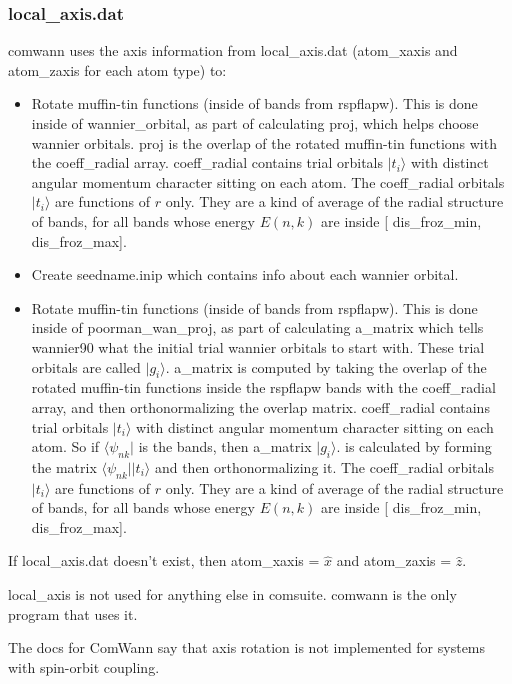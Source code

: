 \documentclass[aps,prb,singlecolumn,preprintnumbers,amsmath,amssymb]{revtex4}
\begin{document}
\subsubsection{local\_axis.dat}
comwann uses the axis information  from local\_axis.dat (atom\_xaxis and atom\_zaxis for each atom type)  to:
  \begin{itemize}
  \item Rotate muffin-tin functions (inside of bands from rspflapw).  This is done inside of wannier\_orbital, as part of calculating proj, which helps choose wannier orbitals.  proj is  the overlap of the rotated muffin-tin functions with the coeff\_radial array.  coeff\_radial contains trial orbitals $|t_i \rangle$ with distinct angular momentum character sitting on  each atom.  The coeff\_radial  orbitals $|t_i \rangle$ are functions of $r$ only.  They are a kind of average of the radial structure of bands, for all bands whose energy $E(n,k)$ are inside [ dis\_froz\_min,  dis\_froz\_max].
  \item Create seedname.inip which contains info about each wannier orbital.
  \item Rotate muffin-tin functions (inside of bands from rspflapw).  This is done inside of poorman\_wan\_proj, as part of calculating a\_matrix which tells wannier90 what the initial trial wannier orbitals to start with.  These trial orbitals are called $|g_i \rangle $.    a\_matrix is  computed by taking the overlap of the rotated muffin-tin functions  inside the rspflapw bands with the coeff\_radial array, and then orthonormalizing the overlap matrix.    coeff\_radial contains trial orbitals $|t_i \rangle$ with distinct angular momentum character sitting on  each atom.  So if $\langle \psi_{nk} | $ is the bands, then a\_matrix $|g_i \rangle $. is calculated by forming the matrix   $\langle \psi_{nk} | |t_i \rangle$ and then orthonormalizing it.  The coeff\_radial  orbitals $|t_i \rangle$ are functions of $r$ only.  They are a kind of average of the radial structure of bands, for all bands whose energy $E(n,k)$ are inside [ dis\_froz\_min,  dis\_froz\_max].
  \end{itemize}
  
  If local\_axis.dat doesn't exist, then atom\_xaxis = $\hat{x}$ and atom\_zaxis = $\hat{z}$.
  
  local\_axis is not used for anything else in comsuite.  comwann is the only program that uses it.
  
  The docs for ComWann say that axis rotation is not implemented for systems with spin-orbit coupling.
\end{document}
